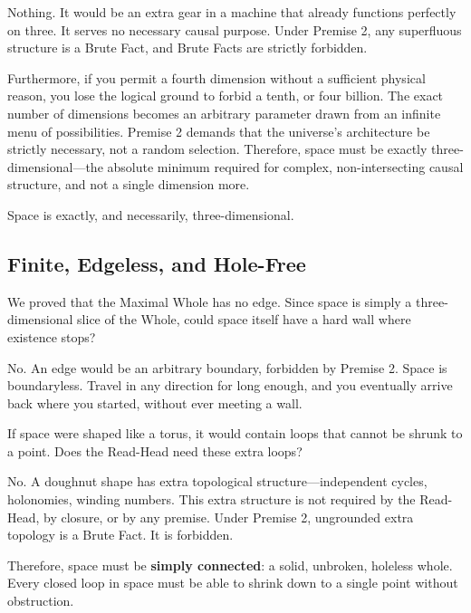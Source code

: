 \documentclass[11pt]{article}
\theoremstyle{canonstyle}
\begin{document}
Nothing. It would be an extra gear in a machine that already functions perfectly on three. It serves no necessary causal purpose. Under Premise 2, any superfluous structure is a Brute Fact, and Brute Facts are strictly forbidden. 

Furthermore, if you permit a fourth dimension without a sufficient physical reason, you lose the logical ground to forbid a tenth, or four billion. The exact number of dimensions becomes an arbitrary parameter drawn from an infinite menu of possibilities. Premise 2 demands that the universe's architecture be strictly necessary, not a random selection. Therefore, space must be exactly three-dimensional---the absolute minimum required for complex, non-intersecting causal structure, and not a single dimension more.

\begin{keyresult}
Space is exactly, and necessarily, three-dimensional.
\end{keyresult}

\subsection{Finite, Edgeless, and Hole-Free}

\begin{reflect}
We proved that the Maximal Whole has no edge. Since space is simply a three-dimensional slice of the Whole, could space itself have a hard wall where existence stops?
\end{reflect}

No. An edge would be an arbitrary boundary, forbidden by Premise 2. Space is boundaryless. Travel in any direction for long enough, and you eventually arrive back where you started, without ever meeting a wall.

\begin{reflect}
If space were shaped like a torus, it would contain loops that cannot be shrunk to a point. Does the Read-Head need these extra loops?
\end{reflect}

No. A doughnut shape has extra topological structure---independent cycles, holonomies, winding numbers. This extra structure is not required by the Read-Head, by closure, or by any premise. Under Premise 2, ungrounded extra topology is a Brute Fact. It is forbidden. 

Therefore, space must be \textbf{simply connected}: a solid, unbroken, holeless whole. Every closed loop in space must be able to shrink down to a single point without obstruction.
\end{document}
